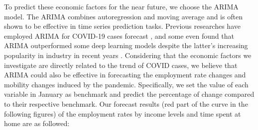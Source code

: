 \documentclass{article}
\begin{document}
\par
To predict these economic factors for the near future, we choose the ARIMA model. The ARIMA combines autoregression and moving average and is often shown to be effective in time series prediction tasks. Previous researches have employed ARIMA for COVID-19 cases forecast \cite{tandon2020coronavirus}, and some even found that ARIMA outperformed some deep learning models despite the latter's increasing popularity in industry in recent years \cite{papastefanopoulos2020covid}. Considering that the economic factors we investigate are directly related to the trend of COVID cases, we believe that ARIMA could also be effective in forecasting the employment rate changes and mobility changes induced by the pandemic. Specifically, we set the value of each variable in January as benchmark and predict the percentage of change compared to their respective benchmark. Our forecast results (red part of the curve in the following figures) of the employment rates by income levels and time spent at home are as followed: 
\end{document}
